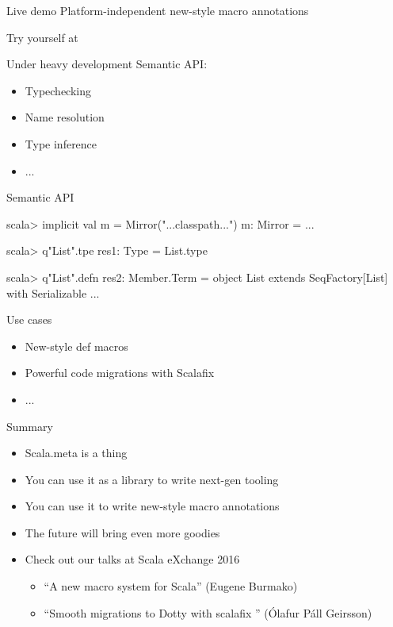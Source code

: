 \documentclass[svgnames,dvipsnames,hyperref={bookmarks=false},usepdftitle=false]{beamer}
\begin{document}
\begin{frame}{Live demo}
Platform-independent new-style macro annotations

\pause

Try yourself at 
\end{frame}


\begin{frame}{Under heavy development}
Semantic API:
\begin{itemize}
\item Typechecking
\item Name resolution
\item Type inference
\item ...
\end{itemize}
\end{frame}

\begin{frame}[fragile]{Semantic API}
\begin{semiverbatim}
scala> implicit val m = Mirror("...classpath...")
m: Mirror = ...

scala> q"List".tpe
res1: Type = List.type

scala> q"List".defn
res2: Member.Term =
object List extends SeqFactory[List] with Serializable { ... }
\end{semiverbatim}
\end{frame}

\begin{frame}{Use cases}
\begin{itemize}
\item New-style def macros
\item Powerful code migrations with Scalafix
\item ...
\end{itemize}
\end{frame}


\begin{frame}{Summary}
\begin{itemize}
\item Scala.meta is a thing
\item You can use it as a library to write next-gen tooling
\item You can use it to write new-style macro annotations
\pause
\vskip40pt
\item The future will bring even more goodies
\item Check out our talks at Scala eXchange 2016
\begin{itemize}
\item ``A new macro system for Scala'' (Eugene Burmako)
\item ``Smooth migrations to Dotty with scalafix '' (\'{O}lafur P\'{a}ll Geirsson)
\end{itemize}
\end{itemize}
\end{frame}
\end{document}
